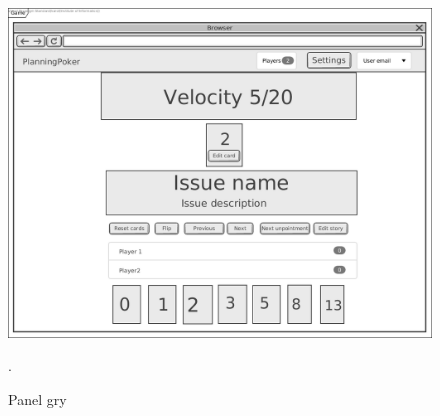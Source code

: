 \begin{figure}[H]
	\centering\includegraphics[width=.7\textwidth]{img/GameScreen}
	\caption{Panel gry}.
	\label{rys:GameScreen}
\end{figure}
